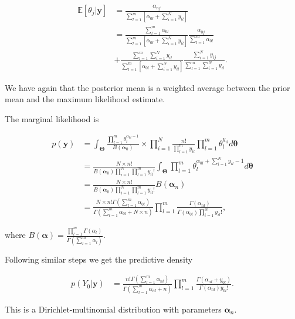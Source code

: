 \begin{enumerate}
\begin{align}
	\mathbb{E}[\theta_{j}|\mathbf{y}]&=\frac{\alpha_{nj}}{\sum_{l=1}^m \left[\alpha_{0l}+\sum_{i=1}^N y_{il}\right]}\nonumber\\
	&=\frac{\sum_{l=1}^m \alpha_{0l}}{\sum_{l=1}^m \left[\alpha_{0l}+\sum_{i=1}^N y_{il}\right]}\frac{\alpha_{0j}}{\sum_{l=1}^m \alpha_{0l}}\nonumber\\
	&+\frac{\sum_{l=1}^m\sum_{i=1}^N y_{il}}{\sum_{l=1}^m \left[\alpha_{0l}+\sum_{i=1}^N y_{il}\right]}\frac{\sum_{i=1}^N y_{ij}}{\sum_{l=1}^m\sum_{i=1}^N y_{il}}.\nonumber
\end{align}

We have again that the posterior mean is a weighted average between the prior mean and the maximum likelihood estimate.

The marginal likelihood is

\begin{align}
	p(\mathbf{y})&=\int_{\mathbf{\Theta}}\frac{\prod_{l=1}^m \theta_l^{\alpha_{0l}-1}}{B(\mathbf{\alpha}_0)}\times \prod_{i=1}^N\frac{n!}{\prod_{l=1}^m y_{il}}\prod_{l=1}^m \theta_{l}^{y_{il}}d\mathbf{\theta}\nonumber\\
	&=\frac{N\times n!}{B(\mathbf{\alpha}_0)\prod_{i=1}^N\prod_{l=1}^m y_{il}!}\int_{\mathbf{\Theta}} \prod_{l=1}^m \theta_l^{\alpha_{0l}+\sum_{i=1}^N y_{il}-1} d\mathbf{\theta}\nonumber\\
	&=\frac{N\times n!}{B(\mathbf{\alpha}_0)\prod_{i=1}^N\prod_{l=1}^m y_{il}!}B(\mathbf{\alpha}_n)\nonumber\\
	&=\frac{N\times n! \Gamma\left(\sum_{l=1}^m\nonumber \alpha_{0l}\right)}{\Gamma\left(\sum_{l=1}^m \alpha_{0l}+N\times n\right)}\prod_{l=1}^m \frac{\Gamma\left( \alpha_{nl}\right)}{\Gamma\left(\alpha_{0l}\right)\prod_{i=1}^N y_{il}!},\nonumber
\end{align}

where $B(\mathbf{\alpha})=\frac{\prod_{l=1}^m\Gamma(\alpha_l)}{\Gamma\left(\sum_{l=1}^m \alpha_l\right)}$.

Following similar steps we get the predictive density

\begin{align}
	p(Y_0|\mathbf{y})&=\frac{ n! \Gamma\left(\sum_{l=1}^m \alpha_{nl}\right)}{\Gamma\left(\sum_{l=1}^m \alpha_{nl}+ n\right)}\prod_{l=1}^m \frac{\Gamma\left( \alpha_{nl}+y_{0l}\right)}{\Gamma\left(\alpha_{nl}\right) y_{0l}!}.\nonumber
\end{align}

This is a Dirichlet-multinomial distribution with parameters $\mathbf{\alpha}_n$.\\


\end{enumerate}
